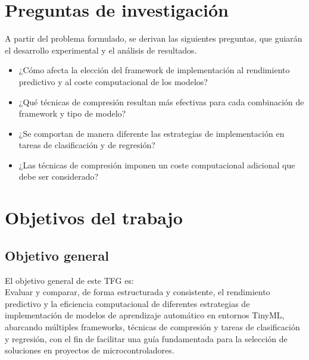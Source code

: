 \documentclass[a4paper,12pt,twoside,final]{book}
\begin{document}
\section{Preguntas de investigación}
A partir del problema formulado, se derivan las siguientes preguntas, que guiarán el desarrollo experimental y el
análisis de resultados.
\begin{itemize}
  \item ¿Cómo afecta la elección del framework de implementación al rendimiento predictivo y al coste computacional
  de los modelos?
  \item ¿Qué técnicas de compresión resultan más efectivas para cada combinación de framework y tipo de modelo?
  \item ¿Se comportan de manera diferente las estrategias de implementación en tareas de clasificación y de
  regresión?
  \item ¿Las técnicas de compresión imponen un coste computacional adicional que debe ser considerado?
\end{itemize}

\section{Objetivos del trabajo}
\subsection{Objetivo general}
El objetivo general de este TFG es:\\

Evaluar y comparar, de forma estructurada y consistente, el rendimiento predictivo y la eficiencia computacional de
diferentes estrategias de implementación de modelos de aprendizaje automático en entornos TinyML, abarcando múltiples
frameworks, técnicas de compresión y tareas de clasificación y regresión, con el fin de facilitar una guía
fundamentada para la selección de soluciones en proyectos de microcontroladores.
\end{document}
